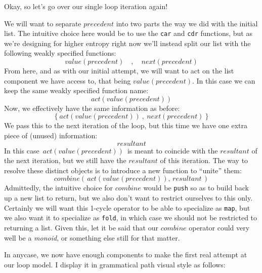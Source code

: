 \documentclass[twoside]{article}
\begin{document}
Okay, so let's go over our single loop iteration again!

We will want to separate $ precedent $ into two parts the way we did with the initial list. The intuitive choice
here would be to use the \texttt{car} and \texttt{cdr} functions, but as we're designing for higher entropy right now
we'll instead split our list with the following weakly specified functions:
$$ value(precedent) \quad,\quad next(precedent) $$
From here, and as with our initial attempt, we will want to act on the list component we have access to, that being
$ value(precedent) $. In this case we can keep the same weakly specified function name:
$$ act(value(precedent)) $$
Now, we effectively have the same information as before:
$$ \{\ act(value(precedent))\ ,\ next(precedent)\ \} $$
We pass this to the next iteration of the loop, but this time we have one extra piece of (unused) information:
$$ resultant $$
In this case $ \,act(value(precedent))\, $ is meant to coincide with the $ resultant $ of the next iteration,
but we still have the $ resultant $ of this iteration. The way to resolve these distinct objects is to introduce
a new function to ``unite'' them:
$$ combine(\,act(value(precedent)),\,resultant\,) $$
Admittedly, the intuitive choice for $ combine $ would be \texttt{push} so as to build back up a new list to return,
but we also don't want to restrict ourselves to this only. Certainly we will want this 1-cycle operator to be able
to specialize as \texttt{map}, but we also want it to specialize as \texttt{fold}, in which case we should not be
restricted to returning a list. Given this, let it be said that our $ combine $ operator could very well be
a \emph{monoid}, or something else still for that matter.

In anycase, we now have enough components to make the first real attempt at our loop model. I display it in grammatical
path visual style as follows:
\end{document}
